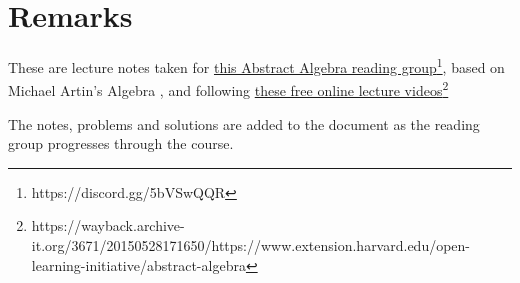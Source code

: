 
\section*{Remarks}

These are lecture notes taken for \href{https://discord.gg/5bVSwQQR}{this Abstract Algebra reading group}\footnote{https://discord.gg/5bVSwQQR}, based on Michael Artin's Algebra \cite{artin2011algebra}, and following \href{https://wayback.archive-it.org/3671/20150528171650/https://www.extension.harvard.edu/open-learning-initiative/abstract-algebra}{these free online lecture videos}\footnote{https://wayback.archive-it.org/3671/20150528171650/https://www.extension.harvard.edu/open-learning-initiative/abstract-algebra}

The notes, problems and solutions are added to the document as the reading group progresses through the course.
